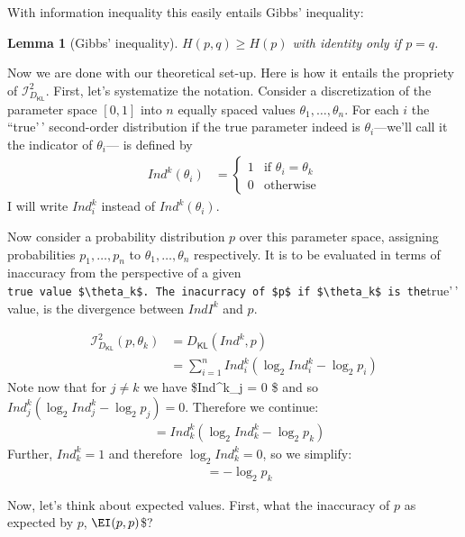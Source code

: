 \documentclass[
  10pt,
  dvipsnames,enabledeprecatedfontcommands]{scrartcl}
\newcommand{\dkl}{D_{\mathsf{KL}}} %
\newtheorem{lemma}{Lemma}
\begin{document}
With information inequality this easily entails Gibbs' inequality:

\begin{lemma}[Gibbs' inequality] $H(p,q) \geq H(p)$ with identity only if $p = q$.
\end{lemma}

Now we are done with our theoretical set-up. Here is how it entails the
propriety of \(\mathcal{I}_{\dkl}^2\). First, let's systematize the
notation. Consider a discretization of the parameter space \([0,1]\)
into \(n\) equally spaced values \(\theta_1, \dots, \theta_n\). For each
\(i\) the ``true'\,' second-order distribution if the true parameter
indeed is \(\theta_i\)---we'll call it the indicator of \(\theta_i\)---
is defined by \begin{align*}
Ind^k(\theta_i) & = \begin{cases} 1 & \mbox{if } \theta_i = \theta_k\\
                        0 & \mbox{otherwise}  \end{cases}
\end{align*} \noindent I will write \(Ind^k_i\) instead of
\(Ind^k(\theta_i)\).

Now consider a probability distribution \(p\) over this parameter space,
assigning probabilities \(p_1, \dots, p_n\) to
\(\theta_1, \dots, \theta_n\) respectively. It is to be evaluated in
terms of inaccuracy from the perspective of a given
\texttt{true\textquotesingle{}\textquotesingle{}\ value\ \$\textbackslash{}theta\_k\$.\ The\ inacurracy\ of\ \$p\$\ if\ \$\textbackslash{}theta\_k\$\ is\ the}true'\,'
value, is the divergence between \(IndI^k\) and \(p\).

\begin{align*}
\mathcal{I}_{\dkl}^2(p, \theta_k) & = \dkl(Ind^k,p) \\
& = \sum_{i=1}^n Ind^k_i \left( \log_2 Ind^k_i - \log_2 p_i \right)
\end{align*} Note now that for \(j \neq k\) we have \$Ind\^{}k\_j = 0 \$
and so \(Ind^k_j \left( \log_2 Ind^k_j - \log_2 p_j \right)=0\).
Therefore we continue: \begin{align*}
& = Ind^k_k \left( \log_2 Ind^k_k - \log_2 p_k \right)
\end{align*} Further, \(Ind^k_k= 1\) and therefore
\(\log_2 Ind^k_k =0\), so we simplify: \begin{align*}
& =  - \log_2 p_k
\end{align*}

\noindent Now, let's think about expected values. First, what the
inaccuracy of \(p\) as expected by \(p\), \(\EI(p,p)\)\$?
\end{document}
